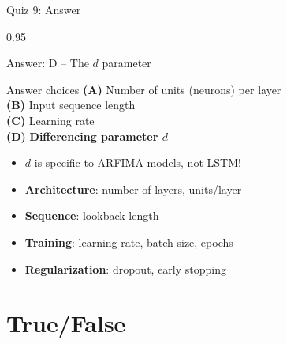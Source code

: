 \documentclass[9pt, aspectratio=169, t]{beamer}
\begin{document}
\begin{frame}{Quiz 9: Answer}
    \begin{cminipage}{0.95\textwidth}
    {\small
    \begin{exampleblock}{Answer: D -- The $d$ parameter}
    \begin{block}{Answer choices}
        \textcolor{MainBlue}{\textbf{(A)}} Number of units (neurons) per layer \incorrect\\[2pt]
        \textcolor{MainBlue}{\textbf{(B)}} Input sequence length \incorrect\\[2pt]
        \textcolor{MainBlue}{\textbf{(C)}} Learning rate \incorrect\\[2pt]
        \textcolor{MainBlue}{\textbf{(D)}} \textbf{\textcolor{Forest}{Differencing parameter $d$}} \correct
    \end{block}

        \vspace{0.1cm}

        \begin{itemize}\setlength{\itemsep}{0pt}
            \item $d$ is specific to ARFIMA models, not LSTM!
            \item \textbf{Architecture}: number of layers, units/layer
            \item \textbf{Sequence}: lookback length
            \item \textbf{Training}: learning rate, batch size, epochs
            \item \textbf{Regularization}: dropout, early stopping
        \end{itemize}
    \end{exampleblock}
    }
    \end{cminipage}
\end{frame}

\section{True/False}
\end{document}
